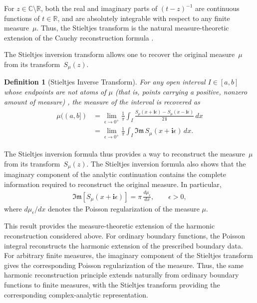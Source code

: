 \documentclass[11pt]{article}
\newtheorem{definition}{Definition}[section]
\newcommand{\imag}{\textbf{i}}
\newcommand{\ImagPart}{\mathfrak{Im}}
\renewcommand{\Im}{\mathfrak{Im}}
\begin{document}
	For $z \in \mathbb{C} \setminus \mathbb{R}$, both the real and imaginary parts of $(t-z)^{-1}$ are continuous functions of $t \in \mathbb{R}$, and are absolutely integrable with respect to any finite measure~$\mu$. Thus, the Stieltjes transform is the natural measure-theoretic extension of the Cauchy reconstruction formula
	\citep{anderson2010introduction,HirschmanWidder1955,WidderLaplaceTransform}.
	
	The Stieltjes inversion transform allows one to recover the original measure~$\mu$ from its transform~$S_\mu(z)$.
	
	\begin{definition}[Stieltjes Inverse Transform]
		For any open interval $I\in[a,b]$ whose endpoints are not atoms of $\mu$ (that is, points carrying a positive, nonzero amount of measure) \citep{anderson2010introduction,HirschmanWidder1955,WidderLaplaceTransform}, the measure of the interval is recovered as
		\begin{align}
			\begin{aligned}
				\mu((a,b]) 
				&= \lim_{\epsilon \to 0^+} \frac{1}{\pi} \int_I \frac{S_\mu(x + \imag\epsilon) - S_\mu(x - \imag\epsilon)}{2 \, \imag} \, dx \\
				&= \lim_{\epsilon \to 0^+} \frac{1}{\pi}  \int_I \Im \, S_\mu(x + \imag\epsilon) \, dx .
				\label{eq.Stieltjes_Inverse_Formula}
			\end{aligned}
		\end{align}
	\end{definition}
	
	The Stieltjes inversion formula thus provides a way to reconstruct the measure~$\mu$ from its transform~$S_{\mu}(z)$. The Stieltjes inversion formula also shows that the imaginary component of the analytic continuation contains the complete information required to reconstruct the original measure. In particular,
	\begin{align}
		\ImagPart\left[S_\mu(x+\imag\epsilon)\right]
		=
		\pi\,\frac{d\mu_\epsilon}{dx},
		\qquad \epsilon>0,
	\end{align}
	where \(d\mu_\epsilon/dx\) denotes the Poisson regularization of the measure \(\mu\).
	
	This result provides the measure-theoretic extension of the harmonic reconstruction considered above. For ordinary boundary functions, the Poisson integral reconstructs the harmonic extension of the prescribed boundary data. For arbitrary finite measures, the imaginary component of the Stieltjes transform gives the corresponding Poisson regularization of the measure. Thus, the same harmonic reconstruction principle extends naturally from ordinary boundary functions to finite measures, with the Stieltjes transform providing the corresponding complex-analytic representation.
	
\end{document}
